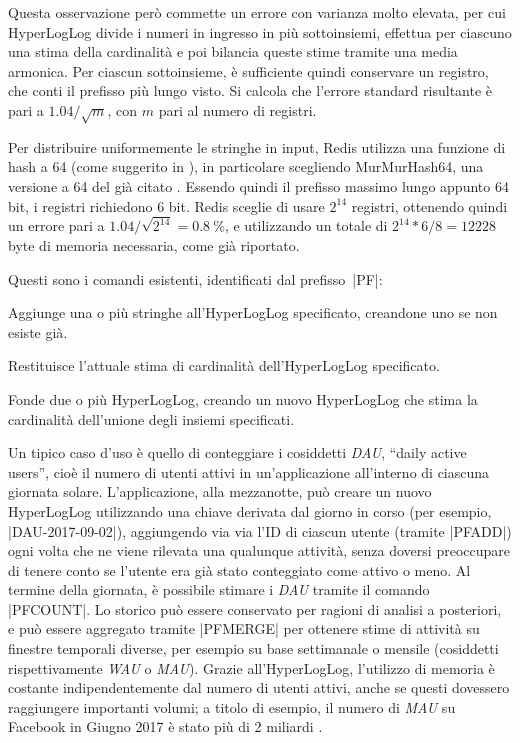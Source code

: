 Questa osservazione però commette un errore con varianza molto elevata, per cui HyperLogLog divide i
numeri in ingresso in più sottoinsiemi, effettua per ciascuno una stima della cardinalità e poi
bilancia queste stime tramite una media armonica. Per ciascun sottoinsieme, è sufficiente quindi
conservare un registro, che conti il prefisso più lungo visto. Si calcola che l'errore standard 
risultante è pari a $1.04 / \sqrt{m}$, con $m$ pari al numero di registri. 

Per distribuire uniformemente le stringhe in input, Redis utilizza una funzione di hash a
\SI{64}{\bit} (come suggerito in \cite{hyperloglog-plusplus}), in particolare scegliendo
MurMurHash64, una versione a \SI{64}{\bit} del già citato
. Essendo quindi il
prefisso massimo lungo appunto 64 bit, i registri richiedono 6 bit. Redis sceglie di usare $2^{14}$
registri, ottenendo quindi un errore pari a $1.04 / \sqrt{2^{14}} = \SI{0.8}{\percent}$, e
utilizzando un totale di $2^{14} * 6 / 8 = \num{12228}$ byte di memoria necessaria, come già
riportato.

Questi sono i comandi esistenti, identificati dal prefisso~\cverb|PF|:

\begin{description}[style=nextline,font={\bfseries\ttfamily}]
	\item[PFADD] Aggiunge una o più stringhe all'HyperLogLog spe\-ci\-fi\-ca\-to,
	creandone uno se non esiste già.
	\item[PFCOUNT] Restituisce l'attuale stima di cardinalità dell'HyperLogLog
	specificato.
	\item[PFMERGE] Fonde due o più HyperLogLog, creando un nuovo HyperLogLog che
	stima la cardinalità dell'unione degli insiemi specificati.
\end{description}

Un tipico caso d'uso è quello di conteggiare i cosiddetti \emph{DAU}, ``daily active users'', cioè
il numero di utenti attivi in un'applicazione all'interno di ciascuna giornata solare.
L'applicazione, alla mezzanotte, può creare un nuovo HyperLogLog utilizzando una chiave derivata dal
giorno in corso (per esempio, \cverb|DAU-2017-09-02|), aggiungendo via via l'ID di ciascun utente
(tramite \cverb|PFADD|) ogni volta che ne viene rilevata una qualunque attività, senza doversi
preoccupare di tenere conto se l'utente era già stato conteggiato come attivo o meno. Al termine
della giornata, è possibile stimare i \emph{DAU} tramite il comando \cverb|PFCOUNT|. Lo storico può
essere conservato per ragioni di analisi a posteriori, e può essere aggregato tramite
\cverb|PFMERGE| per ottenere stime di attività su finestre temporali diverse, per esempio su base
settimanale o mensile (cosiddetti rispettivamente \emph{WAU} o \emph{MAU}). Grazie all'HyperLogLog,
l'utilizzo di memoria è costante indipendentemente dal numero di utenti attivi, anche se questi
dovessero raggiungere importanti volumi; a titolo di esempio, il numero di \emph{MAU} su Facebook in
Giugno 2017 è stato più di 2 miliardi \cite{fb-mau}.

